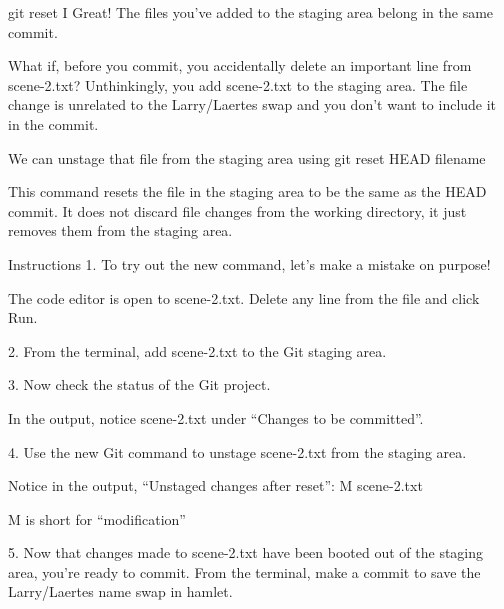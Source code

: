git reset I
    Great! The files you’ve added to the staging area belong in the same commit.

    What if, before you commit, you accidentally delete an important line from scene-2.txt? Unthinkingly, you add scene-2.txt to the staging area. The file change is unrelated to the Larry/Laertes swap and you don’t want to include it in the commit.

    We can unstage that file from the staging area using
        git reset HEAD filename
    
    This command resets the file in the staging area to be the same as the HEAD commit. It does not discard file changes from the working directory, it just removes them from the staging area.

Instructions
    1.
    To try out the new command, let’s make a mistake on purpose!

    The code editor is open to scene-2.txt. Delete any line from the file and click Run.

    2.
    From the terminal, add scene-2.txt to the Git staging area.

    3.
    Now check the status of the Git project.

    In the output, notice scene-2.txt under “Changes to be committed”.

    4.
    Use the new Git command to unstage scene-2.txt from the staging area.

    Notice in the output, “Unstaged changes after reset”:
        M    scene-2.txt
    
    M is short for “modification”
    
    5.
    Now that changes made to scene-2.txt have been booted out of the staging area, you’re ready to commit. From the terminal, make a commit to save the Larry/Laertes name swap in hamlet.